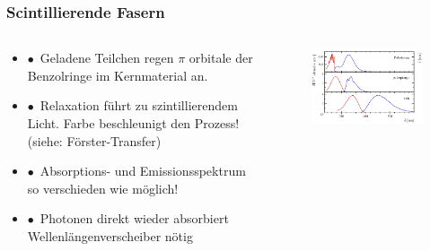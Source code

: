 \documentclass[aspectratio=1610, 12pt, xcolor=dvipsnames]{beamer}
\begin{document}
\begin{frame}\frametitle{Scintillierende Fasern}
  \begin{columns}
    \begin{column}[c]{0.48\textwidth}
      \begin{itemize}
        \item $\bullet$\, Geladene Teilchen regen $\pi$ orbitale der Benzolringe im Kernmaterial an.
        \item $\bullet$\, Relaxation führt zu szintillierendem Licht. Farbe beschleunigt den Prozess! (siehe: Förster-Transfer)
        \item $\bullet$\, Absorptions- und Emissionsspektrum so verschieden wie möglich!
        \item $\bullet$\, \to Photonen direkt wieder absorbiert \to Wellenlängenverscheiber nötig
      \end{itemize}
    \end{column}
    \begin{column}[c]{0.48\textwidth}
      \begin{figure}
        \centering
        \includegraphics[width=\textwidth]{plots/shift_scifi.png}
      \end{figure}
    \end{column}
  \end{columns}
\end{frame}
\end{document}
